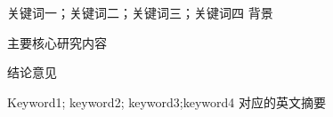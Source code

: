 \begin{cnabstract}{关键词一；关键词二；关键词三；关键词四}
背景

主要核心研究内容

结论意见

\end{cnabstract}


\begin{engabstract}{Keyword1; keyword2; keyword3;keyword4}
对应的英文摘要
\end{engabstract}